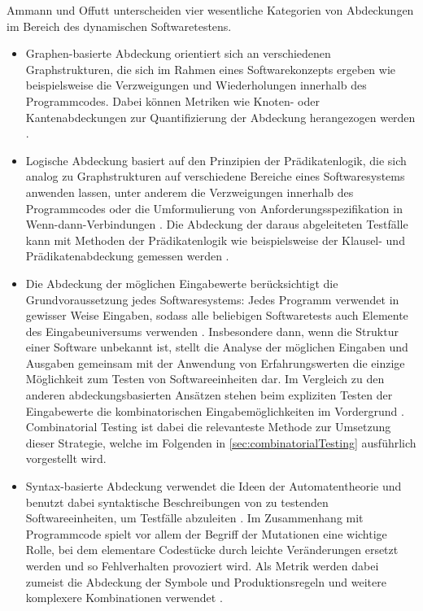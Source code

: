 Ammann und Offutt \cite{ammann2008introduction} unterscheiden vier wesentliche Kategorien von Abdeckungen im Bereich des dynamischen Softwaretestens. 
\begin{itemize}
\item Graphen-basierte Abdeckung orientiert sich an verschiedenen Graphstrukturen, die sich im Rahmen eines Softwarekonzepts ergeben wie beispielsweise die Verzweigungen und Wiederholungen innerhalb des Programmcodes. Dabei können Metriken wie Knoten- oder Kantenabdeckungen zur Quantifizierung der Abdeckung herangezogen werden \cite[S. 27 ff.]{ammann2008introduction}.
\item Logische Abdeckung basiert auf den Prinzipien der Prädikatenlogik, die sich analog zu Graphstrukturen auf verschiedene Bereiche eines Softwaresystems anwenden lassen, unter anderem die Verzweigungen innerhalb des Programmcodes oder die Umformulierung von Anforderungsspezifikation in Wenn-dann-Verbindungen \cite[S. 131 ff.]{ammann2008introduction}. Die Abdeckung der daraus abgeleiteten Testfälle kann mit Methoden der Prädikatenlogik wie beispielsweise der Klausel- und Prädikatenabdeckung gemessen werden \cite[S. 106 ff.]{ammann2008introduction}.
\item Die Abdeckung der möglichen Eingabewerte berücksichtigt die Grundvoraussetzung jedes Softwaresystems: Jedes Programm verwendet in gewisser Weise Eingaben, sodass alle beliebigen Softwaretests auch Elemente des Eingabeuniversums verwenden \cite[S. 150]{ammann2008introduction}. Insbesondere dann, wenn die Struktur einer Software unbekannt ist, stellt die Analyse der möglichen Eingaben und Ausgaben gemeinsam mit der Anwendung von Erfahrungswerten die einzige Möglichkeit zum Testen von Softwareeinheiten dar. Im Vergleich zu den anderen abdeckungsbasierten Ansätzen stehen beim expliziten Testen der Eingabewerte die kombinatorischen Eingabemöglichkeiten im Vordergrund \cite[S. 150 ff.]{ammann2008introduction}. Combinatorial Testing ist dabei die relevanteste Methode zur Umsetzung dieser Strategie, welche im Folgenden in \autoref{sec:combinatorialTesting} ausführlich vorgestellt wird. 
\item Syntax-basierte Abdeckung verwendet die Ideen der Automatentheorie und benutzt dabei syntaktische Beschreibungen von zu testenden Softwareeinheiten, um Testfälle abzuleiten \cite[S. 170 ff.]{ammann2008introduction}. Im Zusammenhang mit Programmcode spielt vor allem der Begriff der Mutationen eine wichtige Rolle, bei dem elementare Codestücke durch leichte Veränderungen ersetzt werden und so Fehlverhalten provoziert wird. Als Metrik werden dabei zumeist die Abdeckung der Symbole und Produktionsregeln und weitere komplexere Kombinationen verwendet \cite[S. 172]{ammann2008introduction}.
\end{itemize}


